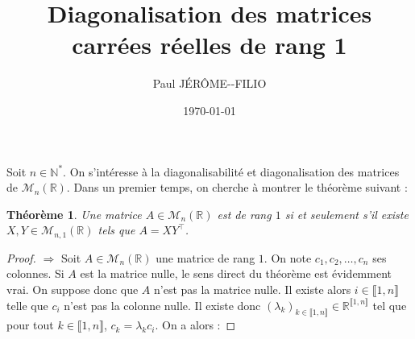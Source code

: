 \documentclass[a4paper]{article}
\title{Diagonalisation des matrices carrées réelles de rang 1}
\date{\today}
\author{Paul JÉRÔME-\--FILIO}
\newtheorem*{theorem}{Théorème}
\begin{document}
\maketitle

Soit $n \in \mathbb{N}^*$. On s'intéresse à la diagonalisabilité et diagonalisation des matrices de $\mathcal{M}_{n}(\mathbb{R})$. Dans un premier temps, on cherche à montrer le théorème suivant :

\begin{theorem}
    Une matrice $A \in \mathcal{M}_{n}(\mathbb{R})$ est de rang $1$ si et seulement s'il existe $X, Y \in \mathcal{M}_{n, 1}(\mathbb{R})$ tels que $A = XY^\top$.
\end{theorem}

\begin{proof}
    $\boxed{\Rightarrow}$ Soit $A \in \mathcal{M}_{n}(\mathbb{R})$ une matrice de rang $1$. On note $c_1, c_2, \dots, c_n$ ses colonnes. Si $A$ est la matrice nulle, le sens direct du théorème est évidemment vrai. On suppose donc que $A$ n'est pas la matrice nulle. Il existe alors $i \in \llbracket 1, n \rrbracket$ telle que $c_i$ n'est pas la colonne nulle. Il existe donc $\left(\lambda_k\right)_{k \in \llbracket 1, n \rrbracket} \in \mathbb{R}^{\llbracket 1, n \rrbracket}$ tel que pour tout $k \in \llbracket 1, n \rrbracket$, $c_k = \lambda_k c_i$. On a alors :
    

\end{proof}
\end{document}
